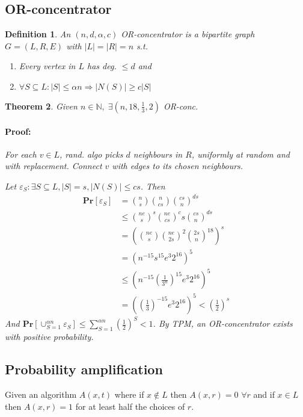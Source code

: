 \documentclass[12pt]{article}
\newtheorem{thm}{Theorem}[section]
\newtheorem{dfn}[thm]{Definition}
\begin{document}
\subsection*{OR-concentrator}
\begin{dfn}
An $(n,d,\alpha,c)$ OR-concentrator is a bipartite graph $G=(L,R,E)$ with $|L|=|R|=n$ s.t.
\begin{enumerate}
\item Every vertex in $L$ has deg. $\leq d$ and 
\item $\forall S \subseteq L : |S| \leq \alpha n \Rightarrow |N(S)| \geq c |S|$ \\
\end{enumerate}
\end{dfn}

\begin{thm}
Given $n \in \mathbb{N}, \; \exists (n,18,\frac{1}{3},2)$ OR-conc.
\paragraph{Proof:} For each $v \in L$, rand. algo picks $d$ neighbours in $R$, uniformly at random and with replacement. Connect $v$ with edges to its chosen neighbours.

Let $\varepsilon_S : \exists S \subseteq L, |S|=s, |N(S)| \leq cs$. Then
\begin{align*}
\mathbf{Pr}[\varepsilon_S]&=\binom{n}{s}\binom{n}{cs}\binom{cs}{n}^{ds} \\
&\leq \binom{ne}{s}^s\binom{ne}{cs}^cs\binom{cs}{n}^{ds} \\
&= \left( \binom{ne}{s}\binom{ne}{2s}^2\binom{2s}{n}^{18} \right)^s  \\
&= \left( n^{-15} s^{15} e^3 2^{16} \right)^5 \\
&\leq \left( n^{-15} \left( \frac{1}{3^n} \right)^{15} e^3 2^{16} \right)^5 \\
&= \left( \left( \frac{1}{3} \right)^{-15} e^3 2^{16} \right)^5 < \left( \frac{1}{2} \right)^s
\end{align*}
And $\mathbf{Pr}\left[ \cup_{S=1}^{\alpha n} \varepsilon_S \right] \leq \sum_{S=1}^{\alpha n} \left(\frac{1}{2}\right)^S < 1$. By TPM, an OR-concentrator exists with positive probability.
\end{thm}

\subsection*{Probability amplification}
Given an algorithm $A(x,t)$ where if $x \not\in L$ then $A(x,r) = 0$ $\forall r$ and if $x \in L$ then $A(x,r)=1$ for at least half the choices of $r$. \\
\end{document}
